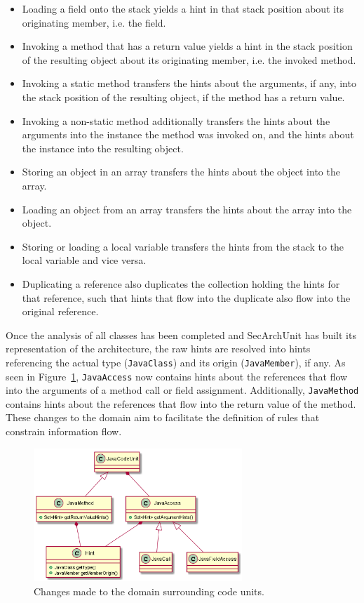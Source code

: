 \begin{itemize}
    \item Loading a field onto the stack yields a hint in that stack position about its originating member, i.e. the field.
    \item Invoking a method that has a return value yields a hint in the stack position of the resulting object about its originating member, i.e. the invoked method.
    \item Invoking a static method transfers the hints about the arguments, if any, into the stack position of the resulting object, if the method has a return value.
    \item Invoking a non-static method additionally transfers the hints about the arguments into the instance the method was invoked on, and the hints about the instance into the resulting object.
    \item Storing an object in an array transfers the hints about the object into the array.
    \item Loading an object from an array transfers the hints about the array into the object.
    \item Storing or loading a local variable transfers the hints from the stack to the local variable and vice versa.
    \item Duplicating a reference also duplicates the collection holding the hints for that reference, such that hints that flow into the duplicate also flow into the original reference.
\end{itemize}

Once the analysis of all classes has been completed and SecArchUnit has built its representation of the architecture, the raw hints are resolved into hints referencing the actual type (\texttt{JavaClass}) and its origin (\texttt{JavaMember}), if any. As seen in Figure~\ref{fig:domain_changes_1}, \texttt{JavaAccess} now contains hints about the references that flow into the arguments of a method call or field assignment. Additionally, \texttt{JavaMethod} contains hints about the references that flow into the return value of the method. These changes to the domain aim to facilitate the definition of rules that constrain information flow.

\begin{figure}
    \centering
    \includegraphics[width=0.7\textwidth]{figure/extension/DomainChanges1.png}
    \caption{Changes made to the domain surrounding code units.}
    \label{fig:domain_changes_1}
\end{figure}

